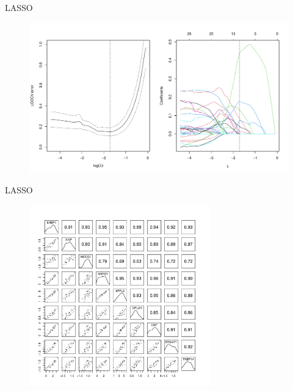 \documentclass{beamer}
\begin{document}
\begin{frame}{LASSO}
  \begin{figure}
    \begin{center}
      \includegraphics[width=\textwidth]{lasso_fitting.pdf}
    \end{center}
  \end{figure}
\end{frame}

\begin{frame}{LASSO}
  \begin{figure}
    \begin{center}
      \includegraphics[width=0.7\textwidth]{lasso_nz_cov.pdf}
    \end{center}
  \end{figure}
\end{frame}
\end{document}
